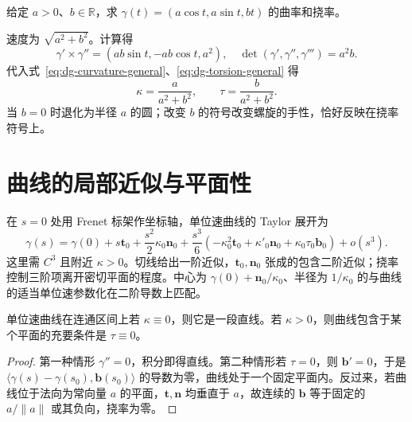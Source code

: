 \documentclass[UTF8,12pt,a4paper,fontset=fandol]{ctexbook}
\newcommand{\R}{\mathbb R}
\newcommand{\ip}[2]{\langle #1,#2\rangle}
\newcommand{\norm}[1]{\lVert #1\rVert}
\begin{document}
\begin{example}[圆柱螺线]\label{exam:dg-helix}
给定 $a>0$、$b\in\R$，求 $\gamma(t)=(a\cos t,a\sin t,bt)$ 的曲率和挠率。
\end{example}
\begin{solve}
速度为 $\sqrt{a^2+b^2}$。计算得
\[
 \gamma'\times\gamma''=(ab\sin t,-ab\cos t,a^2),\quad
 \det(\gamma',\gamma'',\gamma''')=a^2b.
\]
代入式~\eqref{eq:dg-curvature-general}、\eqref{eq:dg-torsion-general} 得
\[
 \kappa=\frac a{a^2+b^2},\qquad \tau=\frac b{a^2+b^2}.
\]
当 $b=0$ 时退化为半径 $a$ 的圆；改变 $b$ 的符号改变螺旋的手性，恰好反映在挠率符号上。
\end{solve}

\section{曲线的局部近似与平面性}
在 $s=0$ 处用 Frenet 标架作坐标轴，单位速曲线的 Taylor 展开为
\begin{equation}
 \gamma(s)=\gamma(0)+s\mathbf t_0+\frac{s^2}{2}\kappa_0\mathbf n_0
 +\frac{s^3}{6}(-\kappa_0^2\mathbf t_0+\kappa'_0\mathbf n_0
 +\kappa_0\tau_0\mathbf b_0)+o(s^3).
 \label{eq:dg-curve-taylor}
\end{equation}
这里需 $C^3$ 且附近 $\kappa>0$。切线给出一阶近似，$\mathbf t_0,\mathbf n_0$ 张成的包含二阶近似；挠率控制三阶项离开密切平面的程度。中心为 $\gamma(0)+\mathbf n_0/\kappa_0$、半径为 $1/\kappa_0$ 的与曲线的适当单位速参数化在二阶导数上匹配。

\begin{proposition}[零曲率与零挠率]
单位速曲线在连通区间上若 $\kappa\equiv0$，则它是一段直线。若 $\kappa>0$，则曲线包含于某个平面的充要条件是 $\tau\equiv0$。
\end{proposition}
\begin{proof}
第一种情形 $\gamma''=0$，积分即得直线。第二种情形若 $\tau=0$，则 $\mathbf b'=0$，于是 $\ip{\gamma(s)-\gamma(s_0)}{\mathbf b(s_0)}$ 的导数为零，曲线处于一个固定平面内。反过来，若曲线位于法向为常向量 $a$ 的平面，$\mathbf t,\mathbf n$ 均垂直于 $a$，故连续的 $\mathbf b$ 等于固定的 $a/\norm a$ 或其负向，挠率为零。
\end{proof}
\end{document}
